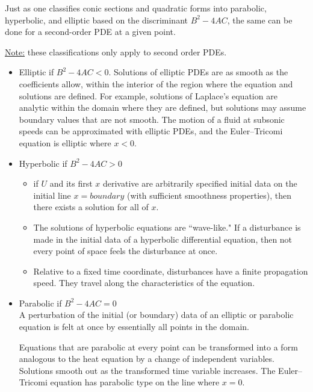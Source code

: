 \documentclass[12pt]{article}
\begin{document}
Just as one classifies conic sections and quadratic forms into parabolic, hyperbolic, and elliptic based on the discriminant $B^2 - 4AC$, the same can be done for a second-order PDE at a given point. 

\underline{Note:} these classifications only apply to second order PDEs. 

\begin{itemize}
\item Elliptic if $B^2 - 4 AC < 0$. Solutions of elliptic PDEs are as smooth as the coefficients allow, within the interior of the region where the equation and solutions are defined. For example, solutions of Laplace's equation are analytic within the domain where they are defined, but solutions may assume boundary values that are not smooth. The motion of a fluid at subsonic speeds can be approximated with elliptic PDEs, and the Euler–Tricomi equation is elliptic where $x < 0$.
\item Hyperbolic if $B^2 - 4 AC > 0$
  \begin{itemize}
  \item if $U$ and its first $x$ derivative are arbitrarily specified initial data on the initial line $x = boundary$ (with sufficient smoothness properties), then there exists a solution for all of $x$.
  \item The solutions of hyperbolic equations are ``wave-like." If a disturbance is made in the initial data of a hyperbolic differential equation, then not every point of space feels the disturbance at once.
  \item Relative to a fixed time coordinate, disturbances have a finite propagation speed. They travel along the characteristics of the equation.
  \end{itemize}
\item Parabolic if $B^2 - 4 AC = 0$\\ A perturbation of the initial (or boundary) data of an elliptic or parabolic equation is felt at once by essentially all points in the domain. 

Equations that are parabolic at every point can be transformed into a form analogous to the heat equation by a change of independent variables. Solutions smooth out as the transformed time variable increases. The Euler–Tricomi equation has parabolic type on the line where $x = 0$.
\end{itemize}
\end{document}
